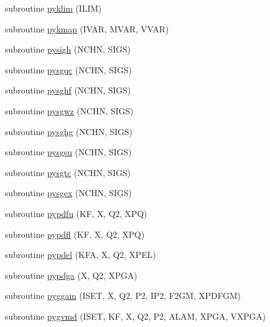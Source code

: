\begin{DoxyCompactItemize}
\item 
subroutine \hyperlink{pythia-6_84_824_8f_a59cf7e6fe3565bf6a5712dae11a239ce}{pyklim} (I\+L\+I\+M)
\item 
subroutine \hyperlink{pythia-6_84_824_8f_a9c057fbd857323d35ea39a826b1fa151}{pykmap} (I\+V\+A\+R, M\+V\+A\+R, V\+V\+A\+R)
\item 
subroutine \hyperlink{pythia-6_84_824_8f_a3ccdee32be69df9daf5605283165a012}{pysigh} (N\+C\+H\+N, S\+I\+G\+S)
\item 
subroutine \hyperlink{pythia-6_84_824_8f_a370a25c3139b210db10c7b1a02289deb}{pysgqc} (N\+C\+H\+N, S\+I\+G\+S)
\item 
subroutine \hyperlink{pythia-6_84_824_8f_a77c632d5235f03df7809688a7d6419bf}{pysghf} (N\+C\+H\+N, S\+I\+G\+S)
\item 
subroutine \hyperlink{pythia-6_84_824_8f_a7e00d0cba57c47a25b6546e4fd054fd3}{pysgwz} (N\+C\+H\+N, S\+I\+G\+S)
\item 
subroutine \hyperlink{pythia-6_84_824_8f_a57a12a8bdfcf423e5b0ed01349b0ff46}{pysghg} (N\+C\+H\+N, S\+I\+G\+S)
\item 
subroutine \hyperlink{pythia-6_84_824_8f_a3bcc54cc63edef034e45de8d31a94568}{pysgsu} (N\+C\+H\+N, S\+I\+G\+S)
\item 
subroutine \hyperlink{pythia-6_84_824_8f_a53e5da7d043dcc4d55c1be6aa5d65423}{pysgtc} (N\+C\+H\+N, S\+I\+G\+S)
\item 
subroutine \hyperlink{pythia-6_84_824_8f_a3e8b67e77bc0f5b4e190277a551e381f}{pysgex} (N\+C\+H\+N, S\+I\+G\+S)
\item 
subroutine \hyperlink{pythia-6_84_824_8f_a18485907fca6114e02a4ea4be006a91e}{pypdfu} (K\+F, X, Q2, X\+P\+Q)
\item 
subroutine \hyperlink{pythia-6_84_824_8f_aeceae4435f53744a1fd6d16580b88e9b}{pypdfl} (K\+F, X, Q2, X\+P\+Q)
\item 
subroutine \hyperlink{pythia-6_84_824_8f_a685bfaaf4e371dea879c7215f06ef963}{pypdel} (K\+F\+A, X, Q2, X\+P\+E\+L)
\item 
subroutine \hyperlink{pythia-6_84_824_8f_adaeea1cf93a90348771583d1ca460c5a}{pypdga} (X, Q2, X\+P\+G\+A)
\item 
subroutine \hyperlink{pythia-6_84_824_8f_a5d921e74d5d3170e13e61189727bb8e4}{pyggam} (I\+S\+E\+T, X, Q2, P2, I\+P2, F2\+G\+M, X\+P\+D\+F\+G\+M)
\item 
subroutine \hyperlink{pythia-6_84_824_8f_a6b802d62748ef3052e945d88179ab875}{pygvmd} (I\+S\+E\+T, K\+F, X, Q2, P2, A\+L\+A\+M, X\+P\+G\+A, V\+X\+P\+G\+A)
\item 

\end{DoxyCompactItemize}
